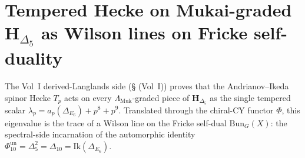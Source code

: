 \section{Tempered Hecke on Mukai-graded
\texorpdfstring{$\mathbf{H}_{\Delta_5}$}{H-Delta-5} as Wilson lines on Fricke self-duality}
\label{sec:gl-kazhdan-fricke-wilson-section}

The Vol~I derived-Langlands side (\S\cite{VolI} (Vol~I))
proves that the Andrianov--Ikeda spinor Hecke $T_p$ acts on every
$\Lambda_{\mathrm{Muk}}$-graded piece of $\mathbf{H}_{\Delta_5}$ as the
single tempered scalar $\lambda_p = a_p(\Delta_{E_6}) + p^8 + p^9$.
Translated through the chiral-CY functor $\Phi$, this eigenvalue is the
trace of a Wilson line on the Fricke self-dual $\mathrm{Bun}_G(X)$: the
spectral-side incarnation of the automorphic identity
$\Phi_{10}^{\mathrm{un}}=\Delta_5^2 = \Delta_{10} = \mathrm{Ik}(\Delta_{E_6})$.

